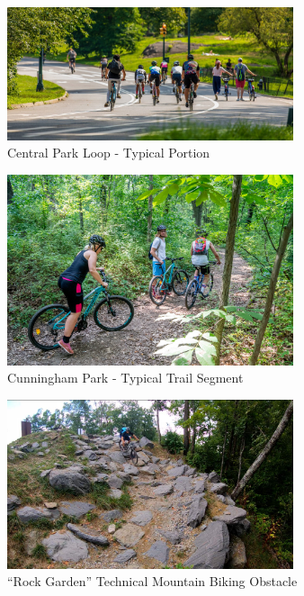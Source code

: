 \documentclass{article}
\begin{document}
\begin{figure}[p]
  \caption{Central Park Loop - Typical Portion}
  \label{CPLoop}
\centering
\includegraphics[width=0.75\textwidth]{ManhattanLoop.jpg}
\end{figure}

\begin{figure}[p]
  \caption{Cunningham Park - Typical Trail Segment}
  \label{CHPLoop}
\centering
\includegraphics[width=0.75\textwidth]{CunninghamTrails.jpg}
\end{figure}

\begin{figure}[p]
  \caption{``Rock Garden'' Technical Mountain Biking Obstacle}
  \label{RockG}
  \centering
  \includegraphics[width=0.75\textwidth]{RockGarden.jpg}
\end{figure}
\end{document}
